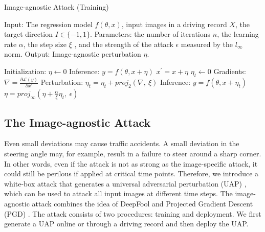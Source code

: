 
\begin{algorithm}[t]
    \caption{Image-agnostic Attack (Training)}\label{alg:image-agnostic-driving}
    \begin{algorithmic}
        \State Input: The regression model $f(\theta, x)$, input images in a driving record $X$, the target direction $I \in \{-1, 1\}$.
        \State Parameters: the number of iterations $n$, the learning rate $\alpha$, the step size $\xi$ , and the strength of the attack $\epsilon$ measured by the $l_{\infty}$ norm.
        \State Output: Image-agnostic perturbation $\eta$.

        \State Initialization: $\eta \leftarrow 0$
                \State Inference: $y = f(\theta, x + \eta)$
                    \State $x^{'} = x + \eta$
                    \State $\eta_{t} \leftarrow 0$
                        \State Gradients: $\nabla = \frac{\partial \mathcal{L}(y)}{\partial x'}$
                        \State Perturbation: $\eta_{t} = \eta_{t} + proj_{2}(\nabla,\ \xi)$
                        \State Inference: $y = f(\theta, x + \eta_t)$
                    \EndWhile
                    \State $\eta = proj_{\infty}(\eta + \frac{\alpha}{\xi} \eta_{t},\ \epsilon)$
                \EndIf
            \EndFor
        \EndFor
    \end{algorithmic}
\end{algorithm}

\subsection{The Image-agnostic Attack}

Even small deviations may cause traffic accidents. A small deviation in the steering angle may, for example, result in a failure to steer around a sharp corner. In other words, even if the attack is not as strong as the image-specific attack, it could still be perilous if applied at critical time points. Therefore, we introduce a white-box attack that generates a universal adversarial perturbation (UAP) \citep{moosavi2017universal}, which can be used to attack all input images at different time steps. The image-agnostic attack combines the idea of DeepFool \citep{moosavi2016deepfool} and Projected Gradient Descent (PGD) \citep{madry2017towards}. The attack consists of two procedures: training and deployment. We first generate a UAP online or through a driving record and then deploy the UAP.

